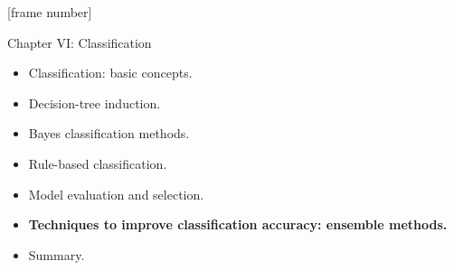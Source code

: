 \documentclass[aspectratio=169,t,table]{beamer}
\begin{document}
  {
    [frame number]
    \begin{frame}{Chapter VI: Classification}
        \begin{itemize}
            \item Classification: basic concepts.
            \item Decision-tree induction.
            \item Bayes classification methods.
            \item Rule-based classification.
            \item Model evaluation and selection.
            \item \textbf{Techniques to improve classification accuracy: ensemble methods.}
            \item Summary.
        \end{itemize}
    \end{frame}
  }
\end{document}
